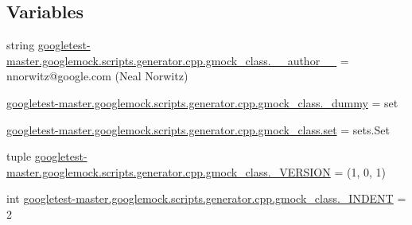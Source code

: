 \subsection*{Variables}
\begin{DoxyCompactItemize}
\item 
string \mbox{\hyperlink{namespacegoogletest-master_1_1googlemock_1_1scripts_1_1generator_1_1cpp_1_1gmock__class_a89504a9d8e95b38524b6ee79e7807f83}{googletest-\/master.\+googlemock.\+scripts.\+generator.\+cpp.\+gmock\+\_\+class.\+\_\+\+\_\+author\+\_\+\+\_\+}} = \textquotesingle{}nnorwitz@google.\+com (Neal Norwitz)\textquotesingle{}
\item 
\mbox{\hyperlink{namespacegoogletest-master_1_1googlemock_1_1scripts_1_1generator_1_1cpp_1_1gmock__class_aab1d0a0fe12fff6417f5430ee7cfb927}{googletest-\/master.\+googlemock.\+scripts.\+generator.\+cpp.\+gmock\+\_\+class.\+\_\+dummy}} = set
\item 
\mbox{\hyperlink{namespacegoogletest-master_1_1googlemock_1_1scripts_1_1generator_1_1cpp_1_1gmock__class_ab0cc39d9ef09874228a767d5d835d56a}{googletest-\/master.\+googlemock.\+scripts.\+generator.\+cpp.\+gmock\+\_\+class.\+set}} = sets.\+Set
\item 
tuple \mbox{\hyperlink{namespacegoogletest-master_1_1googlemock_1_1scripts_1_1generator_1_1cpp_1_1gmock__class_abf7a71bde27bae67d68746e33dcadd79}{googletest-\/master.\+googlemock.\+scripts.\+generator.\+cpp.\+gmock\+\_\+class.\+\_\+\+V\+E\+R\+S\+I\+ON}} = (1, 0, 1)
\item 
int \mbox{\hyperlink{namespacegoogletest-master_1_1googlemock_1_1scripts_1_1generator_1_1cpp_1_1gmock__class_a467d2f1d7df04768ccec7d5f3c295200}{googletest-\/master.\+googlemock.\+scripts.\+generator.\+cpp.\+gmock\+\_\+class.\+\_\+\+I\+N\+D\+E\+NT}} = 2
\end{DoxyCompactItemize}

